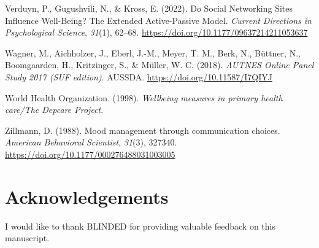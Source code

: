 \documentclass[
  man,mask,floatsintext]{apa7}
\newlength{\cslhangindent}
\newenvironment{CSLReferences}[2] %
 {\begin{list}{}{%
  \setlength{\itemindent}{0pt}
  \setlength{\leftmargin}{0pt}
  \setlength{\parsep}{0pt}
  \ifodd #1
   \setlength{\leftmargin}{\cslhangindent}
   \setlength{\itemindent}{-1\cslhangindent}
  \fi
  \setlength{\itemsep}{#2\baselineskip}}}
 {\end{list}}
\begin{document}
\begin{CSLReferences}{1}{0}
Verduyn, P., Gugushvili, N., \& Kross, E. (2022). Do {Social Networking Sites Influence Well-Being}? {The Extended Active-Passive Model}. \emph{Current Directions in Psychological Science}, \emph{31}(1), 62--68. \url{https://doi.org/10.1177/09637214211053637}

Wagner, M., Aichholzer, J., Eberl, J.-M., Meyer, T. M., Berk, N., Büttner, N., Boomgaarden, H., Kritzinger, S., \& Müller, W. C. (2018). \emph{{AUTNES Online Panel Study} 2017 ({SUF} edition)}. AUSSDA. \url{https://doi.org/10.11587/I7QIYJ}

World Health Organization. (1998). \emph{Wellbeing measures in primary health care/{The Depcare Project}}.

Zillmann, D. (1988). Mood management through communication choices. \emph{American Behavioral Scientist}, \emph{31}(3), 327340. \url{https://doi.org/10.1177/000276488031003005}

\end{CSLReferences}

\section{Acknowledgements}\label{acknowledgements}

I would like to thank BLINDED for providing valuable feedback on this manuscript.
\end{document}
